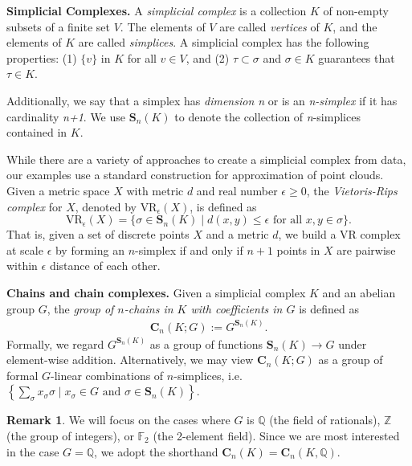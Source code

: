 \documentclass[11pt,onecolumn]{article}
\newcommand{\Z}{\mathbb{Z}}
\newcommand{\Q}{\mathbb{Q}}
\newcommand{\field}{\mathbb{F}}
\newcommand{\Chains}{\mathbf{C}}
\newcommand{\Simplices}[0]{\mathbf{S}}
\theoremstyle{plain}
\theoremstyle{definition}
\newtheorem{remark}[theorem]{Remark}
\begin{document}
\noindent \textbf{Simplicial Complexes.} A \textit{simplicial complex} is a collection $K$ of non-empty subsets of a finite set $V$. The elements of $V$ are called \textit{vertices} of $K$, and the elements of $K$ are called \textit{simplices}. A simplicial complex has the following properties: (1) $\{v\}$ in $K$ for all $v \in V$, and (2) $\tau \subset \sigma$ and $\sigma \in K$ guarantees that $\tau \in K$. 


Additionally, we say that a simplex has \textit{dimension n} or is an \textit{n-simplex} if it has cardinality \textit{n+1}. We use $\Simplices_n(K)$ to denote the collection of \textit{n}-simplices contained in $K$. 


While there are a variety of approaches to create a simplicial complex from data, our examples use a standard construction for approximation of point clouds.  Given a metric space $X$ with metric $d$ and real number $\epsilon \ge 0$, the \textit{Vietoris-Rips complex} for $X$, denoted by $\text{VR}_\epsilon(X)$, is defined as $$\text{VR}_\epsilon (X) = \{\sigma \in \Simplices_n(K) \mid d(x,y) \leq  \epsilon \text{ for all } x, y \in \sigma\}.$$
That is, given a set of discrete points $X$ and a metric $d$, we build a VR complex at scale $\epsilon$ by forming an $n$-simplex if and only if $n+1$ points in $X$ are pairwise within $\epsilon$ distance of each other. 

\noindent \textbf{Chains and chain complexes.}
Given a simplicial complex $K$ and an abelian group  $G$, the \emph{group of $n$-chains in $K$ with coefficients in $G$} is defined as
%
    \begin{align*}
        \Chains_n(K; G) 
        :=
        G^{\Simplices_n(K)}.
    \end{align*}
%    
Formally, we regard $G^{\Simplices_n(K)}$ as a group of functions $\Simplices_n(K) \to G$ under element-wise addition. Alternatively, we may view $\Chains_n(K; G)$ as a group of formal $G$-linear combinations of $n$-simplices, i.e. $\left \{\sum_{\sigma}x_{\sigma} \sigma \mid x_{\sigma} \in G \text{ and } \sigma \in \Simplices_n(K) \right \}$.

\begin{remark}\label{rm:group}
We will focus on the cases where $G$ is $\Q$ (the field of rationals), $\Z$ (the group of integers), or $\field_2$ (the 2-element field).  Since we are most interested in the case $G = \Q$, we adopt the shorthand $\Chains_n(K) = \Chains_n(K,\mathbb{Q})$. 
\end{remark}
\end{document}
